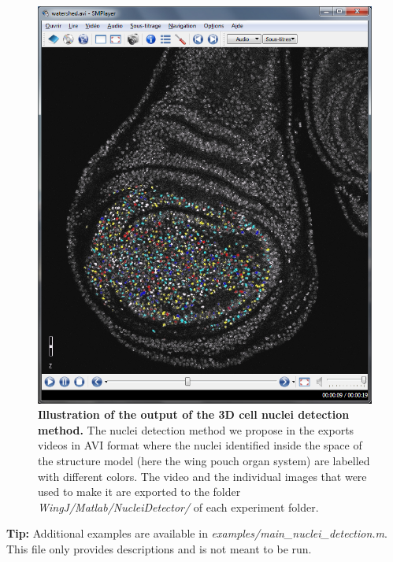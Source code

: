 \begin{figure}[!h]
\centering
\includegraphics[scale=0.40]{images/watershed.jpg}
\caption{\textbf{Illustration of the output of the 3D cell nuclei detection method.} The nuclei detection method we propose in the \wingjMatlab exports videos in AVI format where the nuclei identified inside the space of the structure model (here the wing pouch organ system) are labelled with different colors. The video and the individual images that were used to make it are exported to the folder \textit{WingJ/Matlab/NucleiDetector/} of each experiment folder.}
\label{fig:watershed}
\end{figure}

\textbf{Tip:} Additional examples are available in \emph{examples/main\_nuclei\_detection.m}. This file only provides descriptions and is not meant to be run.